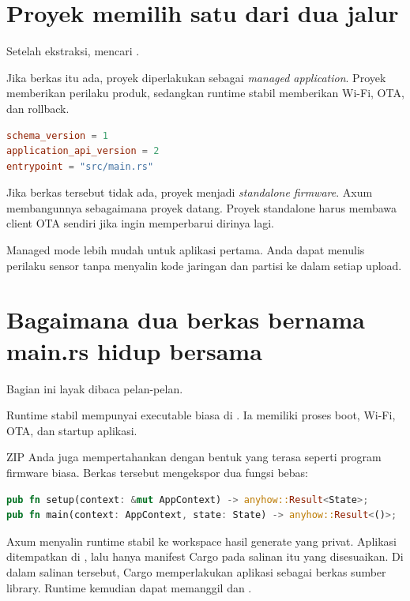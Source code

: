 \section{Proyek memilih satu dari dua jalur}

Setelah ekstraksi,  mencari .

Jika berkas itu ada, proyek diperlakukan sebagai \emph{managed application}. Proyek memberikan perilaku produk, sedangkan runtime stabil memberikan Wi-Fi, OTA, dan rollback.

\begin{lstlisting}[language=TOML,numbers=none]
schema_version = 1
application_api_version = 2
entrypoint = "src/main.rs"
\end{lstlisting}

Jika berkas tersebut tidak ada, proyek menjadi \emph{standalone firmware}. Axum membangunnya sebagaimana proyek datang. Proyek standalone harus membawa client OTA sendiri jika ingin memperbarui dirinya lagi.

Managed mode lebih mudah untuk aplikasi pertama. Anda dapat menulis perilaku sensor tanpa menyalin kode jaringan dan partisi ke dalam setiap upload.

\section{Bagaimana dua berkas bernama main.rs hidup bersama}

Bagian ini layak dibaca pelan-pelan.

Runtime stabil mempunyai executable biasa  di . Ia memiliki proses boot, Wi-Fi, OTA, dan startup aplikasi.

ZIP Anda juga mempertahankan  dengan bentuk yang terasa seperti program firmware biasa. Berkas tersebut mengekspor dua fungsi bebas:

\begin{lstlisting}[language=Rust]
pub fn setup(context: &mut AppContext) -> anyhow::Result<State>;
pub fn main(context: AppContext, state: State) -> anyhow::Result<()>;
\end{lstlisting}

Axum menyalin runtime stabil ke workspace hasil generate yang privat. Aplikasi ditempatkan di , lalu hanya manifest Cargo pada salinan itu yang disesuaikan. Di dalam salinan tersebut, Cargo memperlakukan  aplikasi sebagai berkas sumber library. Runtime kemudian dapat memanggil  dan .

